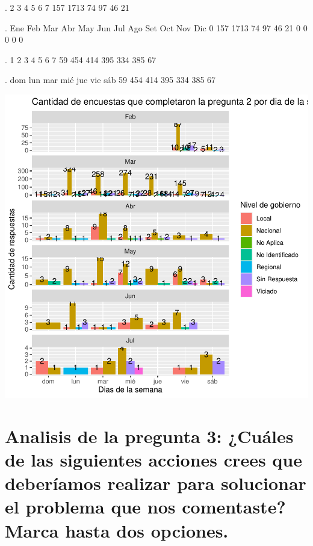 \documentclass{article}
\begin{document}
\begin{Schunk}
\begin{Soutput}
.
   2    3    4    5    6    7 
 157 1713   74   97   46   21 
\end{Soutput}
\begin{Soutput}
.
 Ene  Feb  Mar  Abr  May  Jun  Jul  Ago  Set  Oct  Nov  Dic 
   0  157 1713   74   97   46   21    0    0    0    0    0 
\end{Soutput}
\begin{Soutput}
.
  1   2   3   4   5   6   7 
 59 454 414 395 334 385  67 
\end{Soutput}
\begin{Soutput}
.
dom lun mar mié jue vie sáb 
 59 454 414 395 334 385  67 
\end{Soutput}
\end{Schunk}
\includegraphics{seguimientov4-004}

\section{Analisis de la pregunta 3: ¿Cuáles de las siguientes acciones crees que deberíamos realizar para solucionar el problema que nos comentaste? Marca hasta dos opciones.}

\begin{Schunk}
\end{Schunk}
\end{document}
